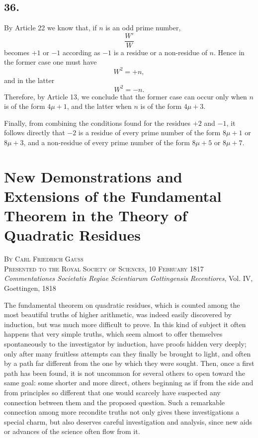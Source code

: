 \documentclass[12pt]{article}
\begin{document}
\subsection*{36.}

By Article 22 we know that, if $n$ is an odd prime number,
\[
\frac{W'}{W}
\]
becomes $+1$ or $-1$ according as $-1$ is a residue or a non-residue of $n$. Hence in the former case one must have
\[
W^2=+n,
\]
and in the latter
\[
W^2=-n.
\]
Therefore, by Article 13, we conclude that the former case can occur only when $n$ is of the form $4\mu+1$, and the latter when $n$ is of the form $4\mu+3$.

Finally, from combining the conditions found for the residues $+2$ and $-1$, it follows directly that $-2$ is a residue of every prime number of the form $8\mu+1$ or $8\mu+3$, and a non-residue of every prime number of the form $8\mu+5$ or $8\mu+7$.



\section*{New Demonstrations and Extensions of the Fundamental Theorem in the Theory of Quadratic Residues}

\begin{center}
\textsc{By Carl Friedrich Gauss}\\
\textsc{Presented to the Royal Society of Sciences, 10 February 1817}\\[2pt]
\emph{Commentationes Societatis Regiae Scientiarum Gottingensis Recentiores}, Vol. IV, Goettingen, 1818
\end{center}

The fundamental theorem on quadratic residues, which is counted among the most beautiful truths of higher arithmetic, was indeed easily discovered by induction, but was much more difficult to prove. In this kind of subject it often happens that very simple truths, which seem almost to offer themselves spontaneously to the investigator by induction, have proofs hidden very deeply; only after many fruitless attempts can they finally be brought to light, and often by a path far different from the one by which they were sought. Then, once a first path has been found, it is not uncommon for several others to open toward the same goal: some shorter and more direct, others beginning as if from the side and from principles so different that one would scarcely have suspected any connection between them and the proposed question. Such a remarkable connection among more recondite truths not only gives these investigations a special charm, but also deserves careful investigation and analysis, since new aids or advances of the science often flow from it.
\end{document}
